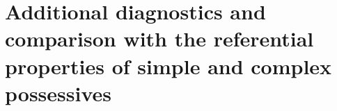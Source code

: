 \documentclass[output=paper]{langsci/langscibook}
\begin{document}
\section{Additional diagnostics and comparison with the referential properties of simple and complex possessives}%
% 
% 
% 
% 
% 
% 
% 
% 
% 
% 
% 
% 
% 
% 
% 
% 
% 
% 
% 
% 
% 
\end{document}
